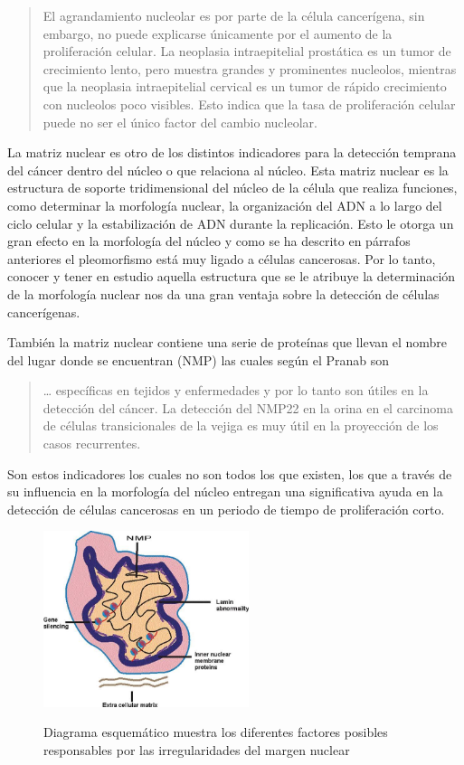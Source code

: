 \documentclass[12pt, letterpaper]{article}
\begin{document}
\blockcquote[][p. 384]{deyCancerNucleusMorphology2010}{
El agrandamiento nucleolar es por parte de la célula cancerígena, sin embargo, no puede explicarse únicamente por el aumento de la proliferación celular. La neoplasia intraepitelial prostática es un tumor de crecimiento lento, pero muestra grandes y prominentes nucleolos, mientras que la neoplasia intraepitelial cervical es un tumor de rápido crecimiento con nucleolos poco visibles. Esto indica que la tasa de proliferación celular puede no ser el único factor del cambio nucleolar.
}


La matriz nuclear es otro de los distintos indicadores para la detección temprana del cáncer dentro del núcleo o que relaciona al núcleo. Esta matriz nuclear es la estructura de soporte tridimensional del núcleo de la célula que realiza funciones, como determinar la morfología nuclear, la organización del ADN a lo largo del ciclo celular y la estabilización de ADN durante la replicación. Esto le otorga un gran efecto en la morfología del núcleo y como se ha descrito en párrafos anteriores el pleomorfismo está muy ligado a células cancerosas. Por lo tanto, conocer y tener en estudio aquella estructura que se le atribuye la determinación de la morfología nuclear nos da una gran ventaja sobre la detección de células cancerígenas.


También la matriz nuclear contiene una serie de proteínas que llevan el nombre del lugar donde se encuentran (NMP) las cuales según el Pranab son \blockcquote[][p. 386]{deyCancerNucleusMorphology2010}{… específicas en tejidos y enfermedades y por lo tanto son útiles en la detección del cáncer. La detección del NMP22 en la orina en el carcinoma de células transicionales de la vejiga es muy útil en la proyección de los casos recurrentes.} 

\pagebreak

Son estos indicadores los cuales no son todos los que existen, los que a través de su influencia en la morfología del núcleo entregan una significativa ayuda en la detección de células cancerosas en un periodo de tiempo de proliferación corto. 


\begin{figure}[h]
\centering
	\includegraphics[width=6cm]{nuclear-margin-irregularities-deyCancerNucleusMorphology2010.jpg}
	\label{fig: irregularities-nucleus}
	\caption{Diagrama esquemático muestra los diferentes factores posibles responsables por las irregularidades del margen nuclear}
	\autocite{deyCancerNucleusMorphology2010}
\end{figure}
\end{document}
